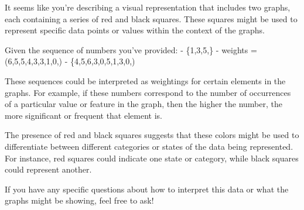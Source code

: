 It seems like you're describing a visual representation that includes two graphs, each containing a series of red and black squares. These squares might be used to represent specific data points or values within the context of the graphs.

Given the sequence of numbers you've provided:
- \{1,3,5,\} - weights = (6,5,5,4,3,3,1,0,)
- \{4,5,6,3,0,5,1,3,0,)

These sequences could be interpreted as weightings for certain elements in the graphs. For example, if these numbers correspond to the number of occurrences of a particular value or feature in the graph, then the higher the number, the more significant or frequent that element is.

The presence of red and black squares suggests that these colors might be used to differentiate between different categories or states of the data being represented. For instance, red squares could indicate one state or category, while black squares could represent another.

If you have any specific questions about how to interpret this data or what the graphs might be showing, feel free to ask!